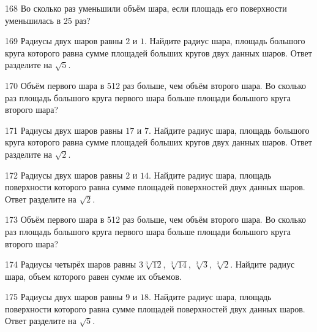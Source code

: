\documentclass[a4paper]{article}
\begin{document}
\begin{taskBN}{168}
Во сколько раз уменьшили объём шара, если площадь его поверхности уменьшилась в 25 раз?
\end{taskBN}

\begin{taskBN}{169}
Радиусы двух шаров равны $2$ и $1$. Найдите радиус шара, площадь большого круга которого равна сумме площадей больших кругов двух данных шаров. Ответ разделите на $\sqrt{5}$.
\end{taskBN}

\begin{taskBN}{170}
Объём первого шара в 512 раз больше, чем объём второго шара. Во сколько раз площадь большого круга первого шара больше площади большого круга второго шара?
\end{taskBN}

\begin{taskBN}{171}
Радиусы двух шаров равны $17$ и $7$. Найдите радиус шара, площадь большого круга которого равна сумме площадей больших кругов двух данных шаров. Ответ разделите на $\sqrt{2}$.
\end{taskBN}

\begin{taskBN}{172}
Радиусы двух шаров равны $2$ и $14$. Найдите радиус шара, площадь поверхности которого равна сумме площадей поверхностей двух данных шаров. Ответ разделите на $\sqrt{2}$.
\end{taskBN}

\begin{taskBN}{173}
Объём первого шара в 512 раз больше, чем объём второго шара. Во сколько раз площадь большого круга первого шара больше площади большого круга второго шара?
\end{taskBN}

\begin{taskBN}{174}
Радиусы четырёх шаров равны $3\sqrt[3]{12}$, $\sqrt[3]{14}$, $\sqrt[3]{3}$, $\sqrt[3]{2}$. Найдите радиус шара, объем которого равен сумме их объемов.
\end{taskBN}

\begin{taskBN}{175}
Радиусы двух шаров равны $9$ и $18$. Найдите радиус шара, площадь поверхности которого равна сумме площадей поверхностей двух данных шаров. Ответ разделите на $\sqrt{5}$.
\end{taskBN}
\end{document}
